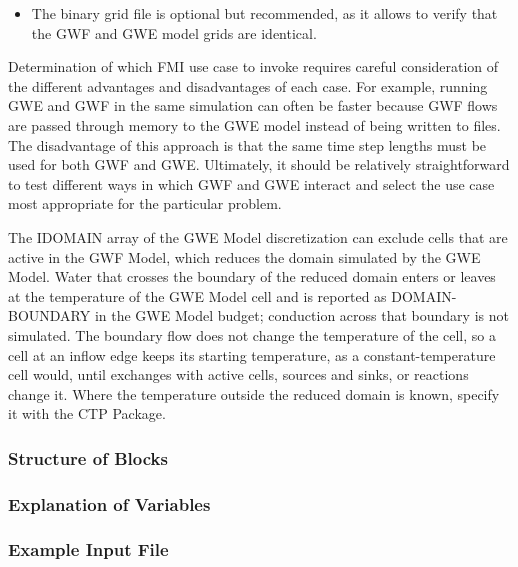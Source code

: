 \begin{itemize}
\begin{itemize}
\item The binary grid file is optional but recommended, as it allows \mf to verify that the GWF and GWE model grids are identical.
\end{itemize}

\end{itemize}

\noindent Determination of which FMI use case to invoke requires careful consideration of the different advantages and disadvantages of each case.  For example, running GWE and GWF in the same simulation can often be faster because GWF flows are passed through memory to the GWE model instead of being written to files.  The disadvantage of this approach is that the same time step lengths must be used for both GWF and GWE.  Ultimately, it should be relatively straightforward to test different ways in which GWF and GWE interact and select the use case most appropriate for the particular problem. 

\noindent The IDOMAIN array of the GWE Model discretization can exclude cells that are active in the GWF Model, which reduces the domain simulated by the GWE Model. Water that crosses the boundary of the reduced domain enters or leaves at the temperature of the GWE Model cell and is reported as DOMAIN-BOUNDARY in the GWE Model budget; conduction across that boundary is not simulated. The boundary flow does not change the temperature of the cell, so a cell at an inflow edge keeps its starting temperature, as a constant-temperature cell would, until exchanges with active cells, sources and sinks, or reactions change it. Where the temperature outside the reduced domain is known, specify it with the CTP Package.

\vspace{5mm}
\subsubsection{Structure of Blocks}



\vspace{5mm}
\subsubsection{Explanation of Variables}
\begin{description}

\end{description}

\vspace{5mm}
\subsubsection{Example Input File}


